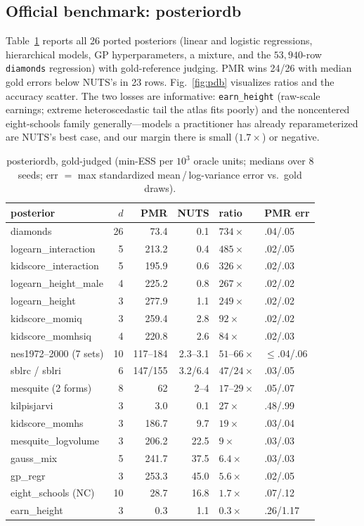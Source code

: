 \documentclass[10pt,journal,compsoc]{IEEEtran}
\begin{document}
\subsection{Official benchmark: posteriordb}
Table~\ref{tab:pdb} reports all 26 ported posteriors (linear and logistic
regressions, hierarchical models, GP hyperparameters, a mixture, and the
$53{,}940$-row \texttt{diamonds} regression) with gold-reference judging.
PMR wins 24/26 with median gold errors below NUTS's in 23 rows.
Fig.~\ref{fig:pdb} visualizes ratios and the accuracy scatter. The two
losses are informative: \texttt{earn\_height} (raw-scale earnings; extreme
heteroscedastic tail the atlas fits poorly) and the noncentered
eight-schools family generally---models a practitioner has already
reparameterized are NUTS's best case, and our margin there is small
($1.7\times$) or negative.

\begin{table}[t]
\caption{posteriordb, gold-judged (min-ESS per $10^3$ oracle units; medians
over 8 seeds; err $=$ max standardized mean\,/\,log-variance error vs.\ gold
draws).}
\label{tab:pdb}
\centering\small
\setlength{\tabcolsep}{3.5pt}
\begin{tabular}{lrrrll}
\toprule
posterior & $d$ & PMR & NUTS & ratio & PMR err\\
\midrule
diamonds & 26 & 73.4 & 0.1 & $734\times$ & .04/.05\\
logearn\_interaction & 5 & 213.2 & 0.4 & $485\times$ & .02/.05\\
kidscore\_interaction & 5 & 195.9 & 0.6 & $326\times$ & .02/.03\\
logearn\_height\_male & 4 & 225.2 & 0.8 & $267\times$ & .02/.02\\
logearn\_height & 3 & 277.9 & 1.1 & $249\times$ & .02/.02\\
kidscore\_momiq & 3 & 259.4 & 2.8 & $92\times$ & .02/.02\\
kidscore\_momhsiq & 4 & 220.8 & 2.6 & $84\times$ & .02/.03\\
nes1972--2000 (7 sets) & 10 & 117--184 & 2.3--3.1 & $51$--$66\times$ & $\le$.04/.06\\
sblrc / sblri & 6 & 147/155 & 3.2/6.4 & $47/24\times$ & .03/.05\\
mesquite (2 forms) & 8 & 62 & 2--4 & $17$--$29\times$ & .05/.07\\
kilpisjarvi & 3 & 3.0 & 0.1 & $27\times$ & .48/.99\\
kidscore\_momhs & 3 & 186.7 & 9.7 & $19\times$ & .03/.04\\
mesquite\_logvolume & 3 & 206.2 & 22.5 & $9\times$ & .03/.03\\
gauss\_mix & 5 & 241.7 & 37.5 & $6.4\times$ & .03/.03\\
gp\_regr & 3 & 253.3 & 45.0 & $5.6\times$ & .02/.05\\
eight\_schools (NC) & 10 & 28.7 & 16.8 & $1.7\times$ & .07/.12\\
earn\_height & 3 & 0.3 & 1.1 & $0.3\times$ & .26/1.17\\
\bottomrule
\end{tabular}
\end{table}
\end{document}
